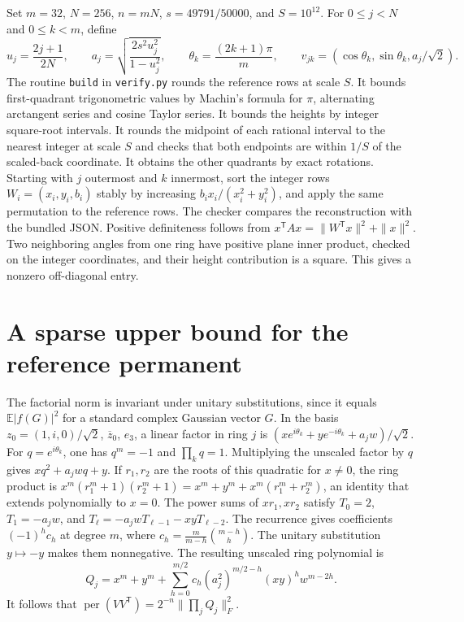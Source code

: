 \documentclass[10pt]{article}
\DeclareMathOperator{\perma}{per}
\begin{document}
Set $m=32$, $N=256$, $n=mN$, $s=49791/50000$, and $S=10^{12}$. For
$0\le j<N$ and $0\le k<m$, define
\[
 u_j=\frac{2j+1}{2N},\qquad
 a_j=\sqrt{\frac{2s^2u_j^2}{1-u_j^2}},\qquad
 \theta_k=\frac{(2k+1)\pi}{m},\qquad
 v_{jk}=(\cos\theta_k,\sin\theta_k,a_j/\sqrt 2).
\]
The routine \texttt{build} in \texttt{verify.py} rounds the reference
rows at scale $S$. It bounds first-quadrant trigonometric values by
Machin's formula for $\pi$, alternating arctangent series and cosine
Taylor series. It bounds the heights by integer square-root intervals.
It rounds the midpoint of each rational interval to the nearest integer
at scale $S$ and checks that both endpoints are within $1/S$ of the
scaled-back coordinate. It obtains the other quadrants by exact rotations.
Starting with $j$ outermost and $k$ innermost, sort the integer rows
$W_i=(x_i,y_i,b_i)$ stably by increasing $b_i x_i/(x_i^2+y_i^2)$, and
apply the same permutation to the reference rows. The checker compares
the reconstruction with the bundled JSON. Positive definiteness follows
from $x^{\mathsf T}Ax=\|W^{\mathsf T}x\|^2+\|x\|^2$. Two neighboring
angles from one ring have positive plane inner product, checked on the
integer coordinates, and their height contribution is a square. This gives
a nonzero off-diagonal entry.

\section{A sparse upper bound for the reference permanent}

The factorial norm is invariant under unitary substitutions, since it
equals $\mathbb E|f(G)|^2$ for a standard complex Gaussian vector $G$.
In the basis $z_0=(1,i,0)/\sqrt2$, $\overline z_0$, $e_3$, a linear
factor in ring $j$ is $(xe^{i\theta_k}+ye^{-i\theta_k}+a_j w)/\sqrt2$.
For $q=e^{i\theta_k}$, one has $q^m=-1$ and $\prod_k q=1$. Multiplying
the unscaled factor by $q$ gives $xq^2+a_jwq+y$. If $r_1,r_2$ are the
roots of this quadratic for $x\ne0$, the ring product is
$x^m(r_1^m+1)(r_2^m+1)=x^m+y^m+x^m(r_1^m+r_2^m)$, an identity that
extends polynomially to $x=0$. The power sums of $xr_1,xr_2$ satisfy
$T_0=2$, $T_1=-a_jw$, and $T_\ell=-a_jwT_{\ell-1}-xyT_{\ell-2}$.
The recurrence gives coefficients $(-1)^hc_h$ at degree $m$, where
$c_h=\frac{m}{m-h}\binom{m-h}{h}$. The unitary substitution $y\mapsto-y$
makes them nonnegative. The resulting unscaled ring polynomial is
\[
 Q_j=x^m+y^m+
 \sum_{h=0}^{m/2}c_h(a_j^2)^{m/2-h}(xy)^h w^{m-2h}.
\]
It follows that $\perma(VV^{\mathsf T})=2^{-n}\|\prod_jQ_j\|_F^2$.
\end{document}
